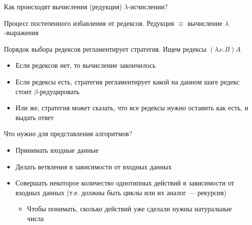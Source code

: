 \begin{frame}{Как происходят вычисления (редукция) $\lambda$-исчислении?}
\begin{definition}[Редукция]
Процесс постепенного избавления от редексов. Редукция $\equiv$ вычисление $\lambda$-выражения
\end{definition}

\begin{definition}[Стратегия]
  Порядок выбора редексов регламентирует стратегия. Ищем редексы $(\lambda x. B)A$
  \begin{itemize}
    \item Если редексов нет, то вычисление закончилось
    \item Если редексы есть, стратегия регламентирует какой на данном шаге редекс стоит $\beta$-редуцировать
    \item Или же, стратегия может сказать, что все редексы нужно оставить как есть, и выдать ответ
  \end{itemize}
\end{definition}
\end{frame}

\begin{frame}{Что нужно для представления алгоритмов?}
  \begin{itemize}
    \item Принимать входные данные
    \item Делать ветвления  в зависимости от входных данных
    \item Совершать некоторое количество однотипных действий в зависимости от входных данных (т.е. должны быть циклы или их аналог --- рекурсия)
    \begin{itemize}
\item       Чтобы понимать, сколько действий уже сделали нужны натуральные числа
    \end{itemize}
  \end{itemize}
\end{frame}

